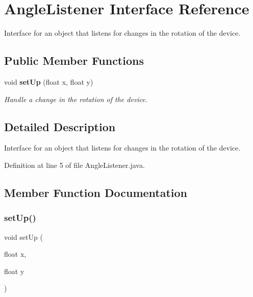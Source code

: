 \section{Angle\+Listener Interface Reference}
\label{interfaceunitingtwist_1_1_angle_listener}


Interface for an object that listens for changes in the rotation of the device.  


\subsection*{Public Member Functions}
\begin{DoxyCompactItemize}
\item 
void \textbf{ set\+Up} (float x, float y)
\begin{DoxyCompactList}\small\item\em Handle a change in the rotation of the device. \end{DoxyCompactList}\end{DoxyCompactItemize}


\subsection{Detailed Description}
Interface for an object that listens for changes in the rotation of the device. 

Definition at line 5 of file Angle\+Listener.\+java.



\subsection{Member Function Documentation}
\mbox{\label{interfaceunitingtwist_1_1_angle_listener_a2e4912428e9969f71dff31060f2debf5}} 
\subsubsection{set\+Up()}
{\footnotesize\ttfamily void set\+Up (\begin{DoxyParamCaption}\item[{float}]{x,  }\item[{float}]{y }\end{DoxyParamCaption})}



